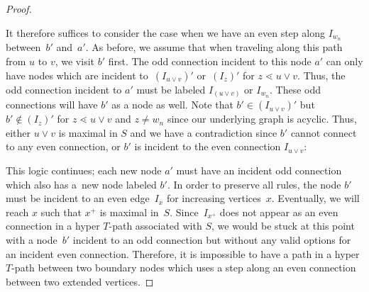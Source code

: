 \documentclass[10pt,a4paper]{amsart}
\numberwithin{equation}{section}
\begin{document}
\begin{proof}
\begin{center}
\end{center}
It therefore suffices to consider the case when we have an even step along $I_{w_n}$ between~$b'$ and~$a'$. As before, we assume that when traveling along this path from $u$ to $v$, we visit $b'$ first. The odd connection incident to this node $a'$ can only have nodes which are incident to~$(I_{u \vee v})'$ or~$(I_z)'$ for $z \lessdot u \vee v$. Thus, the odd connection incident to $a'$ must be labeled $I_{(u \vee v)}$ or $I_{w_n}$. These odd connections will have $b'$ as a node as well. Note that $b' \in (I_{u \vee v})'$ but $b' \notin (I_z)'$ for $z \lessdot u \vee v$ and $z \neq w_n$ since our underlying graph is acyclic. Thus, either $u\vee v$ is maximal in $S$ and we have a contradiction since $b'$ cannot connect to any even connection, or $b'$ is incident to the even connection $I_{u \vee v}$:
\begin{center}
\end{center}
This logic continues; each new node $a'$ must have an incident odd connection which also has a~new node labeled $b'$. In order to preserve all rules, the node $b'$ must be incident to an even edge~$I_x$ for increasing vertices~$x$. Eventually, we will reach $x$ such that $x^+$ is maximal in~$S$. Since~$I_{x^+}$ does not appear as an even connection in a hyper $T$-path associated with $S$, we would be stuck at this point with a node~$b'$ incident to an odd connection but without any valid options for an incident even connection. Therefore, it is impossible to have a path in a hyper $T$-path between two boundary nodes which uses a step along an even connection between two extended vertices.

\end{proof}
\end{document}
